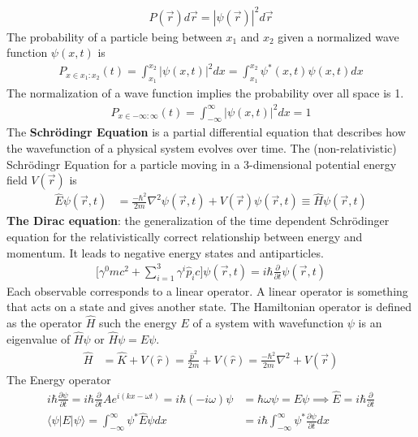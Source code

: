 \begin{align}
	P(\vec{r}) d\vec{r} = |\psi(\vec{r})|^2d\vec{r}
\end{align}
The probability of a particle being between $x_1$ and $x_2$ given a normalized wave function $\psi(x,t)$ is
\begin{align}
	P_{x\in x_1:x_2}(t)=\int_{x_1}^{x_2}|\psi(x,t)|^2dx=\int_{x_1}^{x_2} \psi^*(x,t)\psi(x,t) dx
\end{align}
The normalization of a wave function implies the probability over all space is 1.
\begin{align}
	P_{x\in -\infty:\infty}(t) = \int_{-\infty}^{\infty}|\psi(x,t)|^2dx=1
\end{align}
The \textbf{Schr\"{o}dingr Equation} is a partial differential equation that describes how the wavefunction of a physical system evolves over time. The (non-relativistic) Schr\"{o}dingr Equation for a particle moving in a 3-dimensional potential energy field $V(\vec{r})$ is
\begin{align}
	\hat{E}\psi(\vec{r},t) &= \frac{-\hbar^2}{2m} \nabla^2 \psi(\vec{r},t)+V(\vec{r})\psi(\vec{r},t)  \equiv \hat{H}\psi(\vec{r},t)
\end{align}
\textbf{The Dirac equation}: the generalization of the time dependent Schr\"{o}dinger equation for the relativistically correct relationship between energy and momentum. It leads to negative energy states and antiparticles.
\begin{align}
	\bigg[\gamma^0mc^2+\sum_{i=1}^{3}\gamma^i\hat{p}_ic \bigg]\psi(\vec{r},t)=i\hbar\frac{\partial}{\partial t}\psi(\vec{r},t)
\end{align}
Each observable corresponds to a linear operator. A linear operator is something that acts on a state and gives another state.
The Hamiltonian operator is defined as the operator $\hat{H}$ such the energy $E$ of a system with wavefunction $\psi$ is an eigenvalue of $\hat{H}\psi$ or $\hat{H}\psi = E \psi$. 
\begin{align}
	\hat{H} &= \hat{K}+V(\hat{r}) = \frac{\hat{p}^2}{2m}+V(\hat{r})= \frac{-\hbar^2}{2m}\nabla^2	+V(\vec{r})
\end{align}
The Energy operator
\begin{align}
	i\hbar\frac{\partial \psi}{\partial t}=i\hbar\frac{\partial}{\partial t}Ae^{i(kx-\omega t)}=i\hbar(-i\omega)\psi&=\hbar\omega\psi=E\psi \implies\hat{E} = i\hbar \frac{\partial}{\partial t} \\
	\langle\psi| E |\psi \rangle = \int_{-\infty}^{\infty} \psi^* \hat{E} \psi dx &= i\hbar \int_{-\infty}^{\infty} \psi^* \frac{\partial \psi}{\partial t} dx
\end{align}
